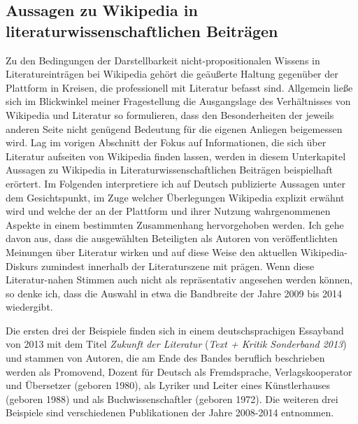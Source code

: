 \documentclass[fontsize=12pt]{scrartcl}
\begin{document}
\pagebreak

\subsection{Aussagen zu Wikipedia in literaturwissenschaftlichen Beitr\"agen}
\label{subsec:5.3}

Zu den Bedingungen der Darstellbarkeit nicht-pro\-po\-si\-ti\-o\-na\-len Wissens in Li\-te\-ra\-tur\-eintr\"agen bei Wi\-ki\-pe\-dia geh\"ort die ge\"au{\ss}erte Haltung gegen\"uber der Plattform in Kreisen, die professionell mit Li\-te\-ra\-tur befasst sind. Allgemein lie{\ss}e sich im Blickwinkel meiner Fragestellung die Ausgangslage des Verh\"altnisses von Wi\-ki\-pe\-dia und Li\-te\-ra\-tur so formulieren, dass den Besonderhei\-ten der jeweils anderen Seite nicht gen\"ugend Bedeutung f\"ur die eigenen Anliegen bei\-ge\-mes\-sen wird. Lag im vorigen Abschnitt der Fokus auf Informationen, die sich \"uber Li\-te\-ra\-tur aufsei\-ten von Wi\-ki\-pe\-dia finden lassen, werden in diesem Unterkapitel Aussagen zu Wi\-ki\-pe\-dia in Li\-te\-ra\-tur\-wissenschaftlichen Beitr\"agen beispielhaft er\"ortert. Im Folgenden interpretiere ich auf \mbox{Deutsch} pu\-bli\-zierte Aussagen unter dem Gesichtspunkt, im Zuge welcher \"Uberlegungen Wi\-ki\-pe\-dia explizit erw\"ahnt wird und welche der an der Plattform und ihrer Nutzung wahrgenommenen Aspekte in einem bestimmten Zusammenhang hervorgehoben werden. Ich gehe davon aus, dass die ausgew\"ahlten Beteiligten als Autoren\textsuperscript{\tiny *} von ver\"of\-fent\-lichten Meinungen \"uber Li\-te\-ra\-tur wirken und auf diese Weise den aktuellen Wi\-ki\-pe\-dia-Diskurs zumindest innerhalb der Li\-te\-ra\-tur\-szene mit pr\"agen. Wenn diese Li\-te\-ra\-tur-nahen Stimmen auch nicht als repr\"asentativ angesehen werden k\"onnen, so denke ich, dass die Auswahl in etwa die Bandbreite der Jahre 2009 bis 2014 wiedergibt. 

Die ersten drei der Beispiele finden sich in einem deutschspra\-chi\-gen Essayband von 2013 mit dem Titel \textit{Zukunft der Li\-te\-ra\-tur} (\textit{Text + Kritik Sonderband 2013}) und stammen von Autoren\textsuperscript{\tiny *}, die am Ende des Bandes beruflich beschrieben werden als Promovend\textsuperscript{\tiny *}, Dozent\textsuperscript{\tiny *} f\"ur \mbox{Deutsch} als Fremdsprache, Verlagskooperator\textsuperscript{\tiny *} und \"Ubersetzer\textsuperscript{\tiny *} (geboren 1980), als Lyriker\textsuperscript{\tiny *} und Leiter\textsuperscript{\tiny *} eines K\"unstlerhauses (geboren 1988) und als Buchwissenschaftler\textsuperscript{\tiny *} (geboren 1972). Die weiteren drei Beispiele sind verschiedenen Publikationen der Jahre 2008-2014 entnommen.\newline
\newline
\end{document}

